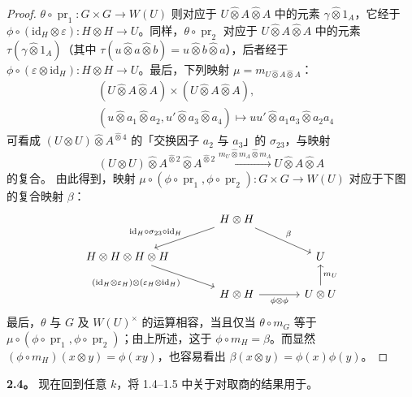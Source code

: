 \begin{proof}
 $\theta\circ\operatorname{pr}_1:G\times G\to W(U)$ 则对应于 $U\widehat\otimes A\widehat\otimes A$ 中的元素 $\gamma\widehat\otimes1_A$，它经于 $\phi\circ(\mathrm{id}_H\otimes\varepsilon):H\otimes H\to U$。同样，$\theta\circ\operatorname{pr}_2$ 对应于 $U\widehat\otimes A\widehat\otimes A$ 中的元素 $\tau(\gamma\widehat\otimes1_A)$（其中 $\tau(u\widehat\otimes a\widehat\otimes b)=u\widehat\otimes b\widehat\otimes a$），后者经于 $\phi\circ(\varepsilon\otimes\mathrm{id}_H):H\otimes H\to U$。最后，下列映射 $\mu=m_{U\widehat\otimes A\widehat\otimes A}$：
\[
\begin{aligned}
{}&(U\widehat\otimes A\widehat\otimes A)\times(U\widehat\otimes A\widehat\otimes A),\\
&(u\widehat\otimes a_1\widehat\otimes a_2,u'\widehat\otimes a_3\widehat\otimes a_4)
\longmapsto uu'\widehat\otimes a_1a_3\widehat\otimes a_2a_4
\end{aligned}
\]
可看成 $(U\otimes U)\widehat\otimes A^{\widehat\otimes4}$ 的「交换因子 $a_2$ 与 $a_3$」的 $\sigma_{23}$，与映射
\[
(U\otimes U)\widehat\otimes A^{\widehat\otimes2}\widehat\otimes A^{\widehat\otimes2}
\xrightarrow{m_U\widehat\otimes m_A\widehat\otimes m_A}U\widehat\otimes A\widehat\otimes A
\]
的复合。
由此得到，映射 $\mu\circ(\phi\circ\operatorname{pr}_1,\phi\circ\operatorname{pr}_2):G\times G\to W(U)$ 对应于下图的复合映射 $\beta$：
\[
\begin{tikzcd}[column sep=large]
&H\otimes H\arrow[dr,"\beta"]\arrow[dl,"\mathrm{id}_H\circ\sigma_{23}\circ\mathrm{id}_H"']&\\
H\otimes H\otimes H\otimes H\arrow[dr,"{(\mathrm{id}_H\otimes\varepsilon_H)\otimes(\varepsilon_H\otimes\mathrm{id}_H)}"']&&U\\
&H\otimes H\arrow[r,"\phi\otimes\phi"']&U\otimes U\arrow[u,"m_U"']
\end{tikzcd}
\]
最后，$\theta$ 与 $G$ 及 $W(U)^\times$ 的运算相容，当且仅当 $\theta\circ m_G$ 等于 $\mu\circ(\phi\circ\operatorname{pr}_1,\phi\circ\operatorname{pr}_2)$；由上所述，这于 $\phi\circ m_H=\beta$。而显然 $(\phi\circ m_H)(x\otimes y)=\phi(xy)$，也容易看出 $\beta(x\otimes y)=\phi(x)\phi(y)$。
\end{proof}

\textbf{2.4。} 现在回到任意 $k$，将 1.4--1.5 中关于对取商的结果用于。

